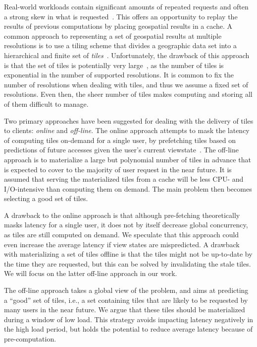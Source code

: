 \documentclass[11pt, oneside]{report}
\begin{document}
Real-world workloads contain significant amounts of repeated requests and often a strong skew in what is requested~\cite{fisher07,talagala00}. This offers an opportunity to replay the results of previous computations by placing geospatial results in a cache. A common approach to representing a set of geospatial results at multiple resolutions is to use a tiling scheme that divides a geographic data set into a hierarchical and finite set of \emph{tiles}~\cite{decola93}. Unfortunately, the drawback of this approach is that the set of tiles is potentially very large~\cite{garcia11}, as the number of tiles is exponential in the number of supported resolutions. It is common to fix the number of resolutions when dealing with tiles, and thus we assume a fixed set of resolutions. Even then, the sheer number of tiles makes computing and storing all of them difficult to manage.

Two primary approaches have been suggested for dealing with the delivery of tiles to clients: \emph{online} and \emph{off-line}. The online approach attempts to mask the latency of computing tiles on-demand for a single user, by prefetching tiles based on predictions of future accesses given the user's current viewstate~\cite{KKK01:Prefetching,KKK01:Prefetching2,LKK+02:Prefetching}. The off-line approach is to materialize a large but polynomial number of tiles in advance that is expected to cover to the majority of user request in the near future. It is assumed that serving the materialized tiles from a cache will be less CPU- and I/O-intensive than computing them on demand. The main problem then becomes selecting a good set of tiles. 

A drawback to the online approach is that although pre-fetching theoretically masks latency for a single user, it does not by itself decrease global concurrency, as tiles are still computed on demand. We speculate that this approach could even increase the average latency if view states are mispredicted. A drawback with materializing a set of tiles offline is that the tiles might not be up-to-date by the time they are requested, but this can be solved by invalidating the stale tiles. We will focus on the latter off-line approach in our work.

The off-line approach takes a global view of the problem, and aims at predicting a ``good'' set of tiles, i.e., a set containing tiles that are likely to be requested by many users in the near future. We argue that these tiles should be materialized during a window of low load. This strategy avoids impacting latency negatively in the high load period, but holds the potential to reduce average latency because of pre-computation.
\end{document}

